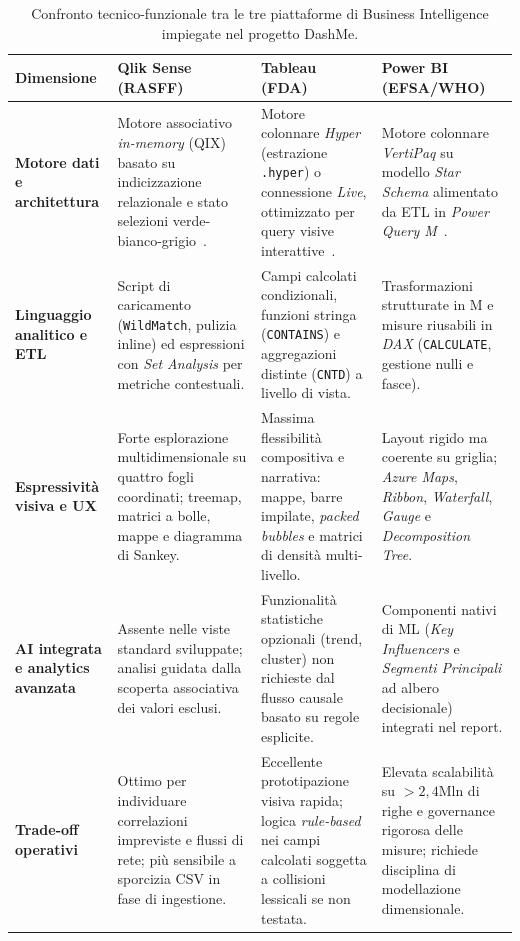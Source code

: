 \begin{table}[htbp]
\centering
\caption{Confronto tecnico-funzionale tra le tre piattaforme di Business Intelligence impiegate nel progetto DashMe.}
\label{tab:platform_comparison}
{\small
\begin{tabularx}{\textwidth}{@{}>{\raggedright\arraybackslash}p{2.5cm}>{\raggedright\arraybackslash}X>{\raggedright\arraybackslash}X>{\raggedright\arraybackslash}X@{}}
\toprule
\textbf{Dimensione} & \textbf{Qlik Sense (RASFF)} & \textbf{Tableau (FDA)} & \textbf{Power BI (EFSA/WHO)} \\
\midrule
\textbf{Motore dati e architettura} &
Motore associativo \textit{in-memory} (QIX) basato su indicizzazione relazionale e stato selezioni verde-bianco-grigio~\citep{qlik_docs}. &
Motore colonnare \textit{Hyper} (estrazione \texttt{.hyper}) o connessione \textit{Live}, ottimizzato per query visive interattive~\citep{tableau_docs}. &
Motore colonnare \textit{VertiPaq} su modello \textit{Star Schema} alimentato da ETL in \textit{Power Query M}~\citep{powerbi_docs}. \\
\addlinespace[0.35em]
\textbf{Linguaggio analitico e ETL} &
Script di caricamento (\texttt{WildMatch}, pulizia inline) ed espressioni con \textit{Set Analysis} per metriche contestuali. &
Campi calcolati condizionali, funzioni stringa (\texttt{CONTAINS}) e aggregazioni distinte (\texttt{CNTD}) a livello di vista. &
Trasformazioni strutturate in M e misure riusabili in \textit{DAX} (\texttt{CALCULATE}, gestione nulli e fasce). \\
\addlinespace[0.35em]
\textbf{Espressività visiva e UX} &
Forte esplorazione multidimensionale su quattro fogli coordinati; treemap, matrici a bolle, mappe e diagramma di Sankey. &
Massima flessibilità compositiva e narrativa: mappe, barre impilate, \textit{packed bubbles} e matrici di densità multi-livello. &
Layout rigido ma coerente su griglia; \textit{Azure Maps}, \textit{Ribbon}, \textit{Waterfall}, \textit{Gauge} e \textit{Decomposition Tree}. \\
\addlinespace[0.35em]
\textbf{AI integrata e analytics avanzata} &
Assente nelle viste standard sviluppate; analisi guidata dalla scoperta associativa dei valori esclusi. &
Funzionalità statistiche opzionali (trend, cluster) non richieste dal flusso causale basato su regole esplicite. &
Componenti nativi di ML (\textit{Key Influencers} e \textit{Segmenti Principali} ad albero decisionale) integrati nel report. \\
\addlinespace[0.35em]
\textbf{Trade-off operativi} &
Ottimo per individuare correlazioni impreviste e flussi di rete; più sensibile a sporcizia CSV in fase di ingestione. &
Eccellente prototipazione visiva rapida; logica \textit{rule-based} nei campi calcolati soggetta a collisioni lessicali se non testata. &
Elevata scalabilità su $>2,4\text{Mln}$ di righe e governance rigorosa delle misure; richiede disciplina di modellazione dimensionale. \\
\bottomrule
\end{tabularx}
}
\end{table}

